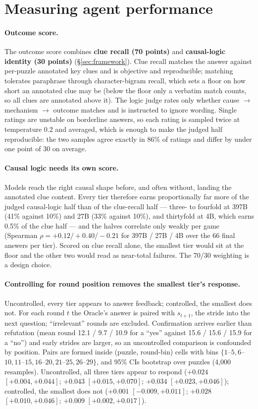 \documentclass{article}
\begin{document}
\section{Measuring agent performance}\label{app:metrics}

\paragraph{Outcome score.} The outcome score combines \textbf{clue recall
(70 points)} and \textbf{causal-logic identity (30 points)}
(\S\ref{sec:framework}). Clue recall matches the answer against per-puzzle
annotated key clues and is objective and reproducible; matching tolerates
paraphrase through character-bigram recall, which sets a floor on how short
an annotated clue may be (below the floor only a verbatim match counts, so
all clues are annotated above it). The logic judge rates only whether cause
$\to$ mechanism $\to$ outcome matches and is instructed to ignore wording.
Single ratings are unstable on borderline answers, so each rating is sampled
twice at temperature 0.2 and averaged, which is enough to make the judged half
reproducible: the two samples agree exactly in 86\% of ratings and differ by
under one point of 30 on average.

\paragraph{Causal logic needs its own score.} Models reach the right causal
shape before, and often without, landing the annotated clue content. Every
tier therefore earns proportionally far more of the judged causal-logic half
than of the clue-recall half --- three- to fourfold at 397B (41\% against
10\%) and 27B (33\% against 10\%), and thirtyfold at 4B, which earns 0.5\% of
the clue half --- and the halves correlate only weakly per game (Spearman
$\rho = +0.12 / +0.40 / -0.21$ for 397B / 27B / 4B over the 66 final answers
per tier).
Scored on clue recall alone, the smallest tier would sit at the floor and the
other two would read as near-total failures. The 70/30 weighting is a design
choice.

\paragraph{Controlling for round position removes the smallest tier's
response.} Uncontrolled, every tier appears to answer feedback; controlled,
the smallest does not. For each
round $t$ the Oracle's answer is paired with $s_{t+1}$, the stride into the next
question; ``irrelevant'' rounds are excluded. Confirmation arrives earlier than
refutation (mean round 12.1 / 9.7 / 10.9 for a ``yes'' against 15.6 / 15.6 / 15.9 for a ``no'') and early strides are larger, so an uncontrolled comparison is confounded
by position. Pairs are formed inside (puzzle, round-bin) cells with bins
$\{1$--$5, 6$--$10, 11$--$15, 16$--$20, 21$--$25, 26$--$29\}$, and 95\% CIs
bootstrap over puzzles (4{,}000 resamples). Uncontrolled, all three tiers appear
to respond ($+0.024$ $[+0.004, +0.044]$; $+0.043$ $[+0.015, +0.070]$; $+0.034$
$[+0.023, +0.046]$); controlled, the smallest does not ($+0.001$ $[-0.009,
+0.011]$; $+0.028$ $[+0.010, +0.046]$; $+0.009$ $[+0.002, +0.017]$).
\end{document}
